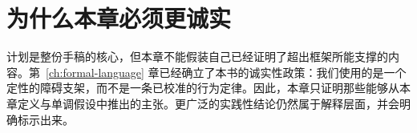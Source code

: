 \section{为什么本章必须更诚实}

计划是整份手稿的核心，但本章不能假装自己已经证明了超出框架所能支撑的内容。第~\ref{ch:formal-language} 章已经确立了本书的诚实性政策：我们使用的是一个定性的障碍支架，而不是一条已校准的行为定律。因此，本章只证明那些能够从本章定义与单调假设中推出的主张。更广泛的实践性结论仍然属于解释层面，并会明确标示出来。